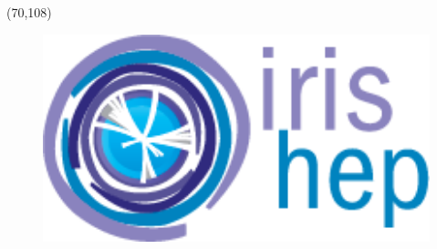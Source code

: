 \documentclass[final]{beamer}
\begin{document}
\begin{frame}{}
\begin{textblock}{8.0}(70,108)
\begin{figure}[tbph]
\centering
\includegraphics[width=1.4\textwidth]{images/Iris-hep-4-no-long-name.png}
\end{figure}
\end{textblock}


\end{frame}
\end{document}
